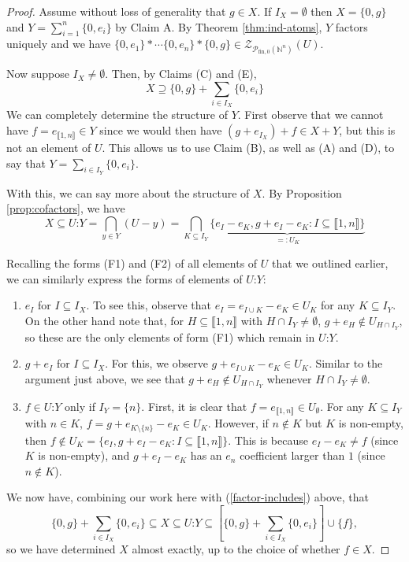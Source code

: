 \documentclass{report}
\newcommand{\NN}{\mathbb{N}}
\renewcommand{\P}{\mathcal{P}}
\newcommand{\Z}{\mathcal{Z}}
\newcommand{\llb}{\llbracket}
\newcommand{\rrb}{\rrbracket}
\newcommand{\fon}{{\textrm{fin}, 0}}
\renewcommand{\:}{\text{:}}
\theoremstyle{definition}
\begin{document}
\begin{proof}
Assume without loss of generality that $g\in X$.
If $I_X = \emptyset$ then $X = \{0,g\}$ and $Y = \sum_{i=1}^n \{0,e_i\}$ by Claim A.
By Theorem \ref{thm:ind-atoms}, $Y$ factors uniquely and we have $\{0,e_1\}*\cdots \{0,e_n\}*\{0,g\}\in \Z_{\P_\fon(\NN^n)}(U)$.

Now suppose $I_X \neq \emptyset$.
Then, by Claims (C) and (E), 
\[X \supseteq \{0,g\} + \sum_{i\in I_X} \{0,e_i\} \tag{1} \label{factor-includes} \]
We can completely determine the structure of $Y$.
First observe that we cannot have $f=e_{\llb1,n\rrb}\in Y$ since we would then have $(g+e_{I_X})+f \in X+Y$, but this is not an element of $U$.
This allows us to use Claim (B), as well as (A) and (D), to say that $Y = \sum_{i\in I_Y} \{0,e_i\}$.

With this, we can say more about the structure of $X$.
By Proposition \ref{prop:cofactors}, we have 
\[X \subseteq U\:Y = \bigcap_{y\in Y}(U-y) = \bigcap_{K\subseteq I_Y} \underbrace{\{e_I - e_K, g+e_I - e_K : I\subseteq \llb 1,n \rrb \}}_{=:U_K} \]

Recalling the forms (F1) and (F2) of all elements of $U$ that we outlined earlier, we can similarly express the forms of elements of $U\:Y$:
\begin{enumerate}[(F1$'$)]
\item $e_I$ for $I\subseteq I_X$. 
To see this, observe that $e_I = e_{I\cup K}-e_K\in U_K$ for any $K\subseteq I_Y$.
On the other hand note that, for $H \subseteq \llb 1,n \rrb$ with $H\cap I_Y\neq \emptyset$, $g+e_H\notin U_{H\cap I_Y}$, so these are the only elements of form (F1) which remain in $U\:Y$.
%
\item $g+e_I$ for $I\subseteq I_X$.
For this, we observe $g+e_{I\cup K} - e_K\in U_K$. 
Similar to the argument just above, we see that $g+e_H\notin U_{H\cap I_Y}$ whenever $H\cap I_Y\neq\emptyset$.
\item $f\in U\:Y$ only if $I_Y = \{n\}$.
First, it is clear that $f = e_{\llb 1,n \rrb} \in U_\emptyset$.
For any $K\subseteq I_Y$ with $n\in K$, $f = g+ e_{K\setminus\{n\}} - e_K\in U_K$.
However, if $n\notin K$ but $K$ is non-empty, then $f\notin U_K = \{e_I, g+e_I-e_K: I\subseteq \llb1,n\rrb\}$.
This is because $e_I - e_K \neq f$ (since $K$ is non-empty), and $g+e_I-e_K$ has an $e_n$ coefficient larger than $1$ (since $n\notin K$).
\end{enumerate}
We now have, combining our work here with (\ref{factor-includes}) above, that
\[ \{0,g\} + \sum_{i\in I_X}\{0,e_i\} \subseteq X \subseteq U\:Y \subseteq \left[\{0,g\}+\sum_{i\in I_X} \{0,e_i\} \right]\cup\{f\},\]
so we have determined $X$ almost exactly, up to the choice of whether $f\in X$.


\end{proof}
\end{document}
